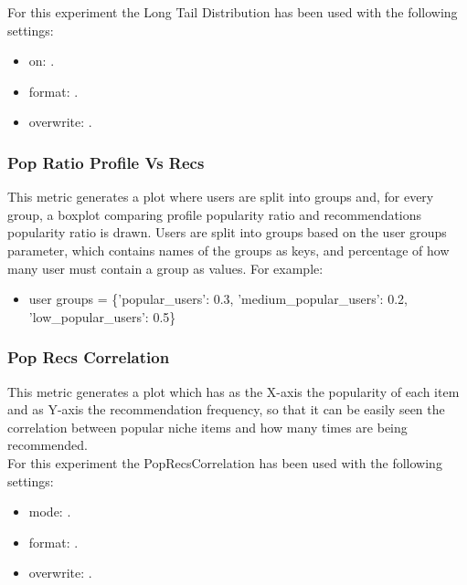 \hfill\break
For this experiment the Long Tail Distribution has been used with the following settings:
\begin{itemize}
    \item on: .
    \item format: .
    \item overwrite: .
\end{itemize}
\hfill\break


\subsubsection{Pop Ratio Profile Vs Recs}\label{subsubsec:popratio}
This metric generates a plot where users are split into groups and, for every group, a boxplot comparing
profile popularity ratio and recommendations popularity ratio is drawn.
Users are split into groups based on the user groups parameter, which contains names of the groups as keys,
and percentage of how many user must contain a group as values.
For example:
\begin{itemize}
       \item user groups = \{'popular\_users': 0.3, 'medium\_popular\_users': 0.2, 'low\_popular\_users': 0.5\}
\end{itemize}
\hfill\break


\subsubsection{Pop Recs Correlation}\label{subsubsec:poprc}
This metric generates a plot which has as the X-axis the popularity of each item and as Y-axis the recommendation
frequency, so that it can be easily seen the correlation between popular niche items and how many times are being
recommended. \\
For this experiment the PopRecsCorrelation has been used with the following settings:
\begin{itemize}
    \item mode: .
    \item format: .
    \item overwrite: .
\end{itemize}
\hfill\break

